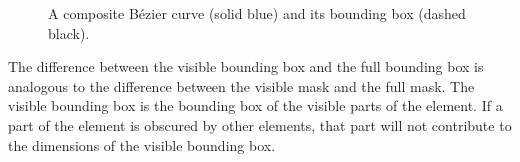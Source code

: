 \begin{definition}
\begin{figure}[H]

        \caption{A composite Bézier curve (solid blue) and its bounding box (dashed black).}
        \label{fig:bbox}
    \end{figure}
\end{definition}

\begin{definition}
    The difference between the visible bounding box and the full bounding box is analogous to the difference between the visible mask and the full mask. The visible bounding box is the bounding box of the visible parts of the element. If a part of the element is obscured by other elements, that part will not contribute to the dimensions of the visible bounding box.
\end{definition}
